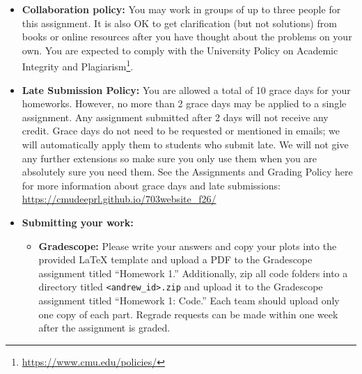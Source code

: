 \documentclass[12pt]{article}
\begin{document}
\begin{itemize}
\item \textbf{Collaboration policy:} You may work in groups of up to three people for this assignment. It is also OK to get clarification (but not solutions) from books or online resources after you have thought about the problems on your own.  You are expected to comply with the University Policy on Academic Integrity and Plagiarism\footnote{\url{https://www.cmu.edu/policies/}}.

\item\textbf{Late Submission Policy:} You are allowed a total of 10 grace days for your homeworks. However, no more than 2 grace days may be applied to a single assignment. Any assignment submitted after 2 days will not receive any credit.  Grace days do not need to be requested or mentioned in emails; we will automatically apply them to students who submit late. We will not give any further extensions so make sure you only use them when you are absolutely sure you need them.  See the Assignments and Grading Policy here for more information about grace days and late submissions: \url{https://cmudeeprl.github.io/703website_f26/}

\item\textbf{Submitting your work:} 
\begin{itemize}


\item \textbf{Gradescope:} Please write your answers and copy your plots into the provided LaTeX template and upload a PDF to the Gradescope assignment titled ``Homework 1.'' Additionally, zip all code folders into a directory titled \texttt{<andrew\_id>.zip} and upload it to the Gradescope assignment titled ``Homework 1: Code.'' Each team should upload only one copy of each part. Regrade requests can be made within one week after the assignment is graded.
\end{itemize}
\end{itemize}
\end{document}
